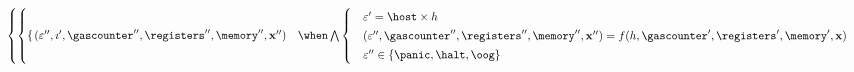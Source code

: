 {\begin{align}
\begin{aligned}
\begin{cases}
\begin{cases}
\begin{aligned}
\begin{cases}
                        \end{cases}
                    \end{aligned}
                    (\varepsilon'', \imath', \gascounter'', \registers'', \mem'', \mathbf{x}'') &\when  \bigwedge \begin{aligned}
                        \begin{cases}
                            &\varepsilon' = \host \times h\\[2pt]
                            &(\varepsilon'', \gascounter'', \registers'', \mem'', \mathbf{x}'') = f(h, \gascounter', \registers', \mem', \mathbf{x})\\[2pt]
                            &\varepsilon'' \in \{\panic, \halt, \oog\}
                        \end{cases}
                    \end{aligned}
                \end{cases} \\
            \end{cases}
        \end{aligned}
    \end{align}
}
\newcommand{\equationapointthirtyfive}{
    \begin{align}
        &\Omega\langle X \rangle \equiv (\N, \N_G, \regs, \ram, X) \to \tuple{\{\continue, \halt, \panic, \oog\}, \N_G, \regs, \ram, X} \cup \{\fault\} \times \N_R
    \end{align}
}
\newcommand{\equationapointthirtysix}{
    Y\colon\begin{aligned}
        \begin{cases}
            \Y &\to (\Y, \regs, \ram)? \\
            \mathbf{p} &\mapsto \begin{cases}
                (\mathbf{c}, \registers, \mem) &\when \exists! (\mathbf{c}, \mathbf{o}, \mathbf{w}, z, s) \text{ which satisfy equation A.35}\\
                \none &\otherwise
            \end{cases}
        \end{cases}
    \end{aligned}
}
\newcommand{\equationapointthirtyseven}{\using \mathcal{E}_3(|\mathbf{o}|) \concat \mathcal{E}_3(|\mathbf{w}|) \concat \mathcal{E}_2(z) \concat \mathcal{E}_3(s) \concat \mathbf{o} \concat \mathbf{w} \concat \mathcal{E}_4(|\mathbf{c}|) \concat \mathbf{c} = \mathbf{p}}
\newcommand{\equationapointthirtyeight}{\mathsf{Z}_Z = 2^{16}\ ,\quad\mathsf{Z}_I = 2^{24}}
